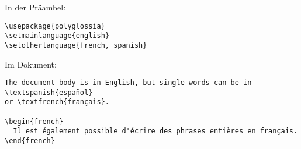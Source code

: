 \documentclass{scrartcl}
\begin{document}
\newsavebox{\SolutionCodeC}
\begin{lrbox}{\SolutionCodeC}
\begin{minipage}{\textwidth}
In der Präambel:
\begin{lstlisting}
\usepackage{polyglossia}
\setmainlanguage{english}
\setotherlanguage{french, spanish}
\end{lstlisting}
Im Dokument:
\begin{lstlisting}
The document body is in English, but single words can be in \textspanish{español}
or \textfrench{français}.

\begin{french}
  Il est également possible d'écrire des phrases entières en français.
\end{french}
\end{lstlisting}
\end{minipage}
\end{lrbox}


\begin{solution}
\noindent\usebox\SolutionCodeC
\end{solution}
\end{document}
